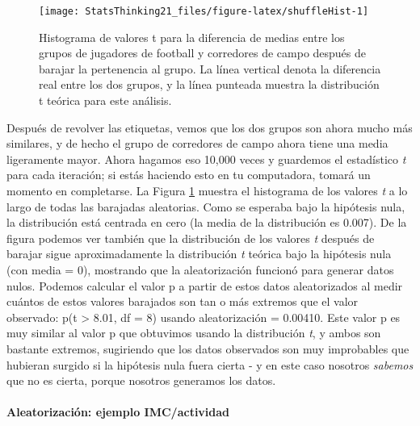 \documentclass[
  12pt,
]{book}
\begin{document}
\begin{figure}
\texttt{[image: StatsThinking21\_files/figure-latex/shuffleHist-1]} \caption{Histograma de valores t para la diferencia de medias entre los grupos de jugadores de football y corredores de campo después de barajar la pertenencia al grupo. La línea vertical denota la diferencia real entre los dos grupos, y la línea punteada muestra la distribución t teórica para este análisis.}\label{fig:shuffleHist}
\end{figure}

Después de revolver las etiquetas, vemos que los dos grupos son ahora mucho más similares, y de hecho el grupo de corredores de campo ahora tiene una media ligeramente mayor. Ahora hagamos eso 10,000 veces y guardemos el estadístico \emph{t} para cada iteración; si estás haciendo esto en tu computadora, tomará un momento en completarse. La Figura \ref{fig:shuffleHist} muestra el histograma de los valores \emph{t} a lo largo de todas las barajadas aleatorias. Como se esperaba bajo la hipótesis nula, la distribución está centrada en cero (la media de la distribución es 0.007). De la figura podemos ver también que la distribución de los valores \emph{t} después de barajar sigue aproximadamente la distribución \emph{t} teórica bajo la hipótesis nula (con media = 0), mostrando que la aleatorización funcionó para generar datos nulos. Podemos calcular el valor p a partir de estos datos aleatorizados al medir cuántos de estos valores barajados son tan o más extremos que el valor observado: p(t \textgreater{} 8.01, df = 8) usando aleatorización = 0.00410. Este valor p es muy similar al valor p que obtuvimos usando la distribución \emph{t}, y ambos son bastante extremos, sugiriendo que los datos observados son muy improbables que hubieran surgido si la hipótesis nula fuera cierta - y en este caso nosotros \emph{sabemos} que no es cierta, porque nosotros generamos los datos.

\hypertarget{aleatorizaciuxf3n-ejemplo-imcactividad}{%
\paragraph{Aleatorización: ejemplo IMC/actividad}\label{aleatorizaciuxf3n-ejemplo-imcactividad}}
\end{document}
